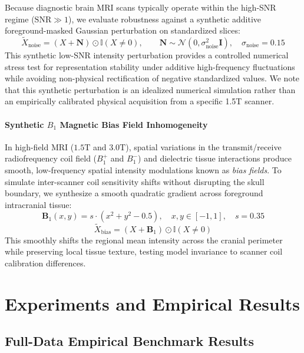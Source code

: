 \documentclass{article}
\begin{document}
Because diagnostic brain MRI scans typically operate within the high-SNR regime ($\text{SNR} \gg 1$), we evaluate robustness against a synthetic additive foreground-masked Gaussian perturbation on standardized slices:
\begin{equation}
    \tilde{X}_{\text{noise}} = \left( X + \mathbf{N} \right) \odot \mathbb{I}(X \neq 0), \qquad \mathbf{N} \sim \mathcal{N}(0, \sigma_{\text{noise}}^2 \mathbf{I}), \quad \sigma_{\text{noise}} = 0.15
\end{equation}
This synthetic low-SNR intensity perturbation provides a controlled numerical stress test for representation stability under additive high-frequency fluctuations while avoiding non-physical rectification of negative standardized values. We note that this synthetic perturbation is an idealized numerical simulation rather than an empirically calibrated physical acquisition from a specific 1.5T scanner.

\paragraph{Synthetic $B_1$ Magnetic Bias Field Inhomogeneity}
In high-field MRI ($1.5\text{T}$ and $3.0\text{T}$), spatial variations in the transmit/receive radiofrequency coil field ($B_1^+$ and $B_1^-$) and dielectric tissue interactions produce smooth, low-frequency spatial intensity modulations known as \emph{bias fields}. To simulate inter-scanner coil sensitivity shifts without disrupting the skull boundary, we synthesize a smooth quadratic gradient across foreground intracranial tissue:
\begin{equation}
    \mathbf{B}_1(x, y) = s \cdot \left( x^2 + y^2 - 0.5 \right), \quad x, y \in [-1, 1], \quad s = 0.35
\end{equation}
\begin{equation}
    \tilde{X}_{\text{bias}} = \left( X + \mathbf{B}_1 \right) \odot \mathbb{I}(X \neq 0)
\end{equation}
This smoothly shifts the regional mean intensity across the cranial perimeter while preserving local tissue texture, testing model invariance to scanner coil calibration differences.


\section{Experiments and Empirical Results}

\subsection{Full-Data Empirical Benchmark Results}
\end{document}
